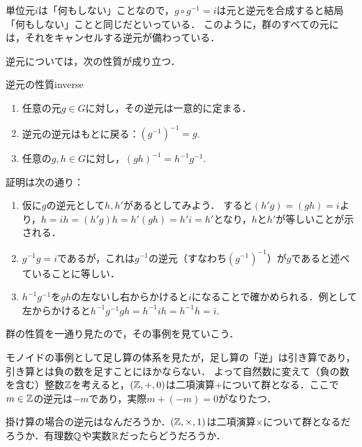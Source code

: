 \documentclass[11pt,a4paper]{jsarticle}
\begin{document}
単位元$i$は「何もしない」ことなので，$g \circ g^{-1} = i$は元と逆元を合成すると結局「何もしない」ことと同じだといっている．
このように，群のすべての元には，それをキャンセルする逆元が備わっている．

逆元については，次の性質が成り立つ．
\begin{prop}{逆元の性質}{inverse}    
\begin{enumerate}
    \item 任意の元$g \in G$に対し，その逆元は一意的に定まる．
    \item 逆元の逆元はもとに戻る：$(g^{-1})^{-1}=g$.
    \item 任意の$g,h \in G$に対し，$(gh)^{-1}=h^{-1}g^{-1}$.
\end{enumerate}
\end{prop}
証明は次の通り：
\begin{enumerate}
    \item 仮に$g$の逆元として$h, h'$があるとしてみよう．
    すると$(h'g)=(gh)=i$より，$h = ih = (h'g)h = h'(gh) = h'i = h'$となり，$h$と$h'$が等しいことが示される．
    \item $g^{-1}g=i$であるが，これは$g^{-1}$の逆元（すなわち$(g^{-1})^{-1}$）が$g$であると述べていることに等しい．
    \item $h^{-1}g^{-1}$を$gh$の左ないし右からかけると$i$になることで確かめられる．例として左からかけると$h^{-1}g^{-1}gh = h^{-1} i h = h^{-1}h = i$.
\end{enumerate}

群の性質を一通り見たので，その事例を見ていこう．

\begin{rei}{}{}
    モノイドの事例として足し算の体系を見たが，足し算の「逆」は引き算であり，引き算とは負の数を足すことにほかならない．
    よって自然数に変えて（負の数を含む）整数$\mathbb{Z}$を考えると，$(\mathbb{Z}, +, 0)$は二項演算$+$について群となる．ここで$m \in \mathbb{Z}$の逆元は$-m$であり，実際$m + (-m) = 0$がなりたつ．
\end{rei}

\begin{renshu}{}{}
    掛け算の場合の逆元はなんだろうか．$(\mathbb{Z}, \times, 1)$は二項演算$\times$について群となるだろうか．有理数$\mathbb{Q}$や実数$\mathbb{R}$だったらどうだろうか．
\end{renshu}
\end{document}
